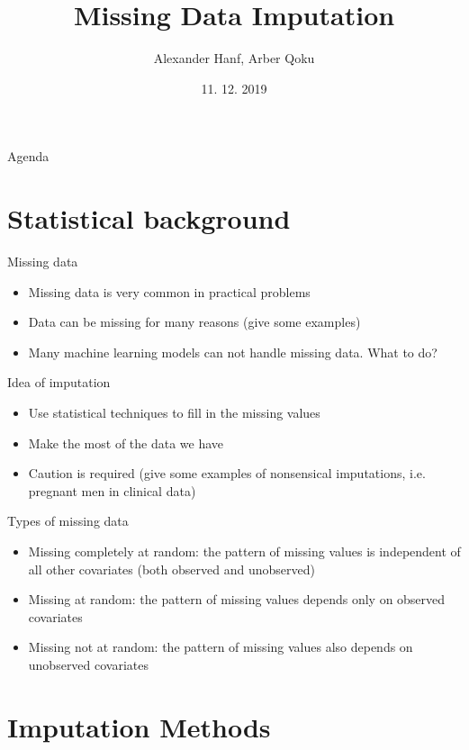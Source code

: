 \documentclass[aspectratio=43]{beamer}
\title{Missing Data Imputation}
\date{11. 12. 2019}
\author{Alexander Hanf, Arber Qoku}
\begin{document}
%
\maketitle

\begin{frame}{Agenda}
\tableofcontents
\end{frame}

\section{Statistical background}

\begin{frame}{Missing data}
\begin{itemize}
\item Missing data is very common in practical problems
\item Data can be missing for many reasons (give some examples)
\item Many machine learning models can not handle missing data. What to do?
\end{itemize}
\end{frame}

\begin{frame}{Idea of imputation}
\begin{itemize}
\item Use statistical techniques to fill in the missing values
\item Make the most of the data we have
\item Caution is required (give some examples of nonsensical imputations, i.e. pregnant men in clinical data)
\end{itemize}
\end{frame}


\begin{frame}{Types of missing data}
\begin{itemize}
\item Missing completely at random: the pattern of missing values is independent of all other covariates (both observed and unobserved)
\item Missing at random: the pattern of missing values depends only on observed covariates
\item Missing not at random: the pattern of missing values also depends on unobserved covariates
\end{itemize}
\end{frame}


\section{Imputation Methods}
\end{document}
